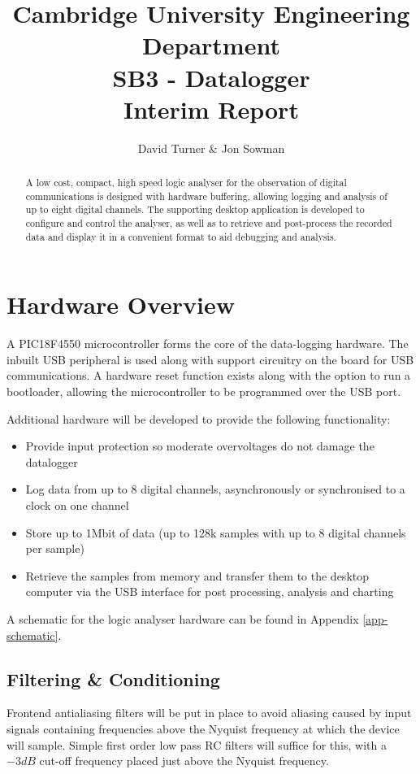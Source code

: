 \documentclass[11pt]{article}
\title{Cambridge University Engineering Department\\SB3 - Datalogger\\Interim Report}
\author{David Turner \& Jon Sowman}
\begin{document}
    \maketitle
	
\begin{abstract}
    A low cost, compact, high speed logic analyser for the observation of digital communications is designed with hardware buffering, allowing logging and analysis of up to eight digital channels. The supporting desktop application is developed to configure and control the analyser, as well as to retrieve and post-process the recorded data and display it in a convenient format to aid debugging and analysis.
\end{abstract}

\section{Hardware Overview}
    A PIC18F4550 microcontroller forms the core of the data-logging hardware. The inbuilt USB peripheral is used along with support circuitry on the board for USB communications. A hardware reset function exists along with the option to run a bootloader, allowing the microcontroller to be programmed over the USB port.

    Additional hardware will be developed to provide the following functionality:
    \begin{itemize}
    \item Provide input protection so moderate overvoltages do not damage the datalogger
    \item Log data from up to 8 digital channels, asynchronously or synchronised to a clock on one channel
    \item Store up to 1Mbit of data (up to 128k samples with up to 8 digital channels per sample)
    \item Retrieve the samples from memory and transfer them to the desktop computer via the USB interface for post processing, analysis and charting
    \end{itemize}

    A schematic for the logic analyser hardware can be found in Appendix
    \ref{app-schematic}.

    \subsection{Filtering \& Conditioning}
    Frontend antialiasing filters will be put in place to avoid aliasing caused by input signals containing frequencies above the Nyquist frequency at which the device will sample. Simple first order low pass RC filters will suffice for this, with a $-3dB$ cut-off frequency placed just above the Nyquist frequency.
\end{document}
